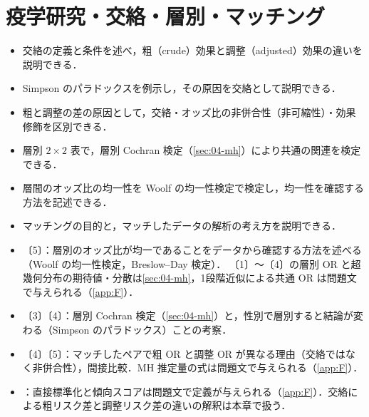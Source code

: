 \chapter{疫学研究・交絡・層別・マッチング}\label{ch:07}

\begin{goalbox}
\begin{itemize}
\item 交絡の定義と条件を述べ，粗（crude）効果と調整（adjusted）効果の違いを説明できる．
\item Simpson のパラドックスを例示し，その原因を交絡として説明できる．
\item 粗と調整の差の原因として，交絡・オッズ比の非併合性（非可縮性）・効果修飾を区別できる．
\item 層別 $2\times2$ 表で，層別 Cochran 検定（\cref{sec:04-mh}）により共通の関連を検定できる．
\item 層間のオッズ比の均一性を Woolf の均一性検定で検定し，均一性を確認する方法を記述できる．
\item マッチングの目的と，マッチしたデータの解析の考え方を説明できる．
\end{itemize}
\end{goalbox}

\begin{exambox}
\begin{itemize}
\item {}〔5〕：層別のオッズ比が均一であることをデータから確認する方法を述べる（Woolf の均一性検定，Breslow--Day 検定）．
      〔1〕〜〔4〕の層別 OR と超幾何分布の期待値・分散は\cref{sec:04-mh}，1段階近似による共通 OR は問題文で与えられる（\cref{app:F}）．
\item {}〔3〕〔4〕：層別 Cochran 検定（\cref{sec:04-mh}）と，性別で層別すると結論が変わる（Simpson のパラドックス）ことの考察．
\item {}〔4〕〔5〕：マッチしたペアで粗 OR と調整 OR が異なる理由（交絡ではなく非併合性），間接比較．MH 推定量の式は問題文で与えられる（\cref{app:F}）．
\item {}：直接標準化と傾向スコアは問題文で定義が与えられる（\cref{app:F}）．交絡による粗リスク差と調整リスク差の違いの解釈は本章で扱う．
\end{itemize}
\end{exambox}


